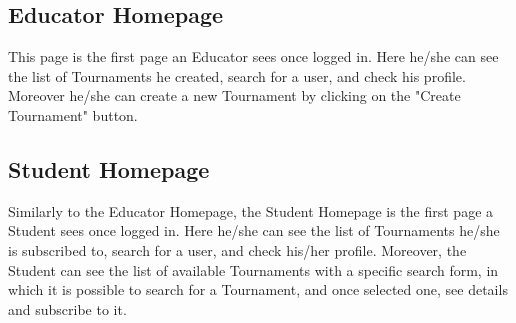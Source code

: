 \subsection{Educator Homepage}
This page is the first page an Educator sees once logged in. Here he/she can see the list of Tournaments he created, search for a user, and check his profile. Moreover he/she can create a new Tournament by clicking on the "Create Tournament" button.\\
\newpage
{}
\clearpage
\subsection{Student Homepage}
Similarly to the Educator Homepage, the Student Homepage is the first page a Student sees once logged in. Here he/she can see the list of Tournaments he/she is subscribed to, search for a user, and check his/her profile. Moreover, the Student can see the list of available Tournaments with a specific search form, in which it is possible to search for a Tournament, and once selected one, see details and subscribe to it.\\
\clearpage
